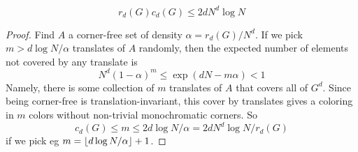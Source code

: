 \begin{lemma}
  \label{lem:corner-num-upper}

  $$r_d(G) c_d(G) \le 2d N^d \log N$$
\end{lemma}
\begin{proof}

  Find $A$ a corner-free set of density $\alpha = r_d(G)/N^d$. If we pick $m > d\log N/\alpha$ translates of $A$ randomly, then the expected number of elements not covered by any translate is
  $$N^d(1 - \alpha)^m \le \exp(dN - m\alpha) < 1$$
  Namely, there is some collection of $m$ translates of $A$ that covers all of $G^d$. Since being corner-free is translation-invariant, this cover by translates gives a coloring in $m$ colors without non-trivial monochromatic corners. So
  $$c_d(G) \le m \le 2d \log N/\alpha = 2d N^d \log N/r_d(G)$$
  if we pick eg $m = \left\lfloor d\log N/\alpha\right\rfloor + 1$.
\end{proof}
